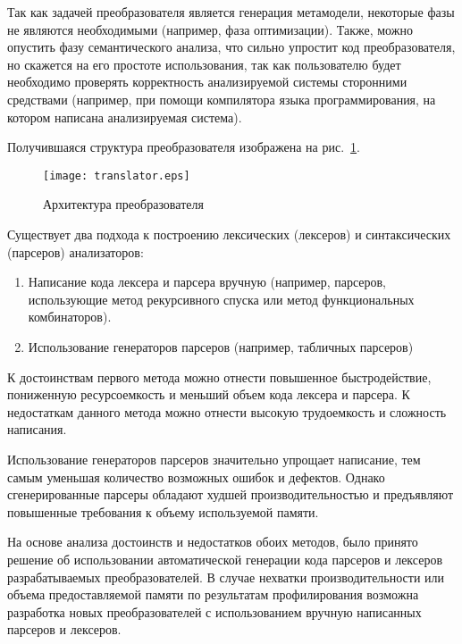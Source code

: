 Так как задачей преобразователя является генерация метамодели, некоторые фазы не
являются необходимыми (например, фаза оптимизации). Также, можно опустить фазу
семантического анализа, что сильно упростит код преобразователя, но скажется на
его простоте использования, так как пользователю будет необходимо проверять
корректность анализируемой системы сторонними средствами (например, при помощи
компилятора языка программирования, на котором написана анализируемая система).

Получившаяся структура преобразователя изображена на рис.~\ref{fig:translator}.

\begin{figure}[ht]
    \begin{center}
        \texttt{[image: translator.eps]}
    \end{center}
    \caption{Архитектура преобразователя}
    \label{fig:translator}
\end{figure}

Существует два подхода к построению лексических (лексеров) и синтаксических
(парсеров) анализаторов:

\begin{enumerate}
    \item Написание кода лексера и парсера вручную (например, парсеров,
    использующие метод рекурсивного спуска или метод функциональных
    комбинаторов).
    \item Использование генераторов парсеров (например, табличных парсеров)
\end{enumerate}

К достоинствам первого метода можно отнести повышенное быстродействие,
пониженную ресурсоемкость и меньший объем кода лексера и парсера. К недостаткам
данного метода можно отнести высокую трудоемкость и сложность написания.

Использование генераторов парсеров значительно упрощает написание, тем самым
уменьшая количество возможных ошибок и дефектов. Однако сгенерированные парсеры
обладают худшей производительностью и предъявляют повышенные требования к объему
используемой памяти.

На основе анализа достоинств и недостатков обоих методов, было принято решение
об использовании автоматической генерации кода парсеров и лексеров
разрабатываемых преобразователей. В случае нехватки производительности или
объема предоставляемой памяти по результатам профилирования возможна разработка
новых преобразователей с использованием вручную написанных парсеров и лексеров.

